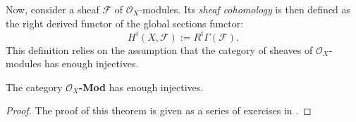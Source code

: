 Now, consider a sheaf $\mathscr{F}$ of $\mathscr{O}_{X}$-modules.
Its \emph{sheaf cohomology} is then defined as the right derived functor of
the global sections functor:
\[
  H^{i}(X, \mathscr{F}) := R^{i}\Gamma\left(\mathscr{F}\right).
\]
This definition relies on the assumption that the category of sheaves of
$\mathscr{O}_{X}$-modules has enough injectives.
\begin{thm}\label{thm:enough_injectives}
  The category $\mathscr{O}_{X}$\textup{\textbf{-Mod}} has enough injectives.
\end{thm}
\begin{proof}
  The proof of this theorem is given as a series of exercises in
  \cite{vakil}.
\end{proof}

